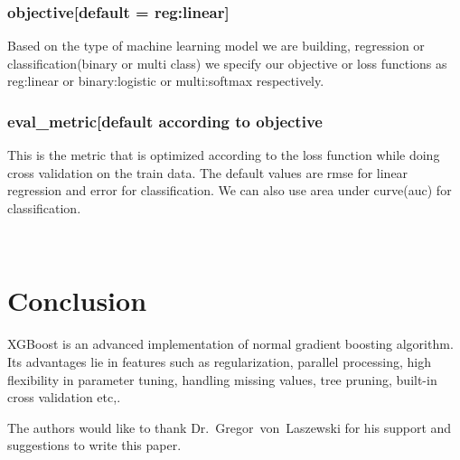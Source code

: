 \subsubsection{objective[default = reg:linear]} Based on the type of machine
learning model we are building, regression or classification(binary or multi
class) we specify our objective or loss functions as reg:linear or
binary:logistic or  multi:softmax respectively.

\subsubsection{eval\_metric[default according to objective} This is the metric
that is optimized according to the loss function while doing cross validation on
the train data. The default values are rmse for linear regression and  error for
classification. We can also use area under curve(auc) for classification.

~\cite{hid-sp18-401-XGBoost-AnalyticsVidhya} 

\section{Conclusion} 

 XGBoost is an advanced implementation of normal gradient boosting algorithm.
Its advantages lie in features  such as regularization, parallel processing,
high flexibility in parameter tuning, handling missing values, tree pruning,
built-in cross validation etc,.

\begin{acks}

  The authors would like to thank Dr.~Gregor~von~Laszewski for his
  support and suggestions to write this paper.

\end{acks}


 


